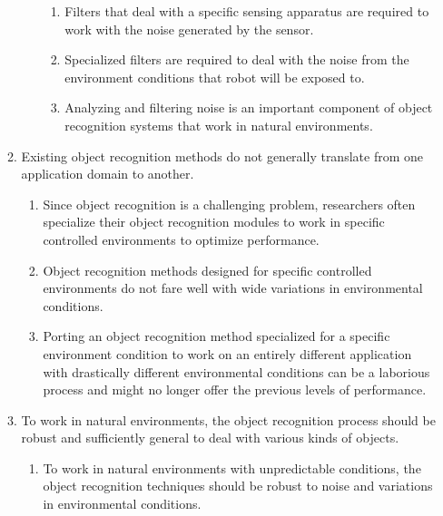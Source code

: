 \documentclass {udthesis}
\begin{document}
\begin{enumerate}[label=Chapter \arabic*:]
\begin{enumerate}[label=Section \arabic*:, start=0]
\begin{enumerate}[label=Subsection \arabic*:, start=1]
      \begin{enumerate}[label=Para \arabic*:, start=1]
        
        \item Filters that deal with a specific sensing apparatus are required to work with the noise generated by the sensor.
        
	\item Specialized filters are required to deal with the noise from the environment conditions that robot will be exposed to.
	
	\item Analyzing and filtering noise is an important component of object recognition systems that work in natural environments.
    
      \end{enumerate}
      
    \end{enumerate}

  \item Existing object recognition methods do not generally translate from one application domain to another.
    
    \begin{enumerate}[label=Para \arabic*:, start=1]
      
      \item Since object recognition is a challenging problem, researchers often specialize their object recognition modules to work in specific controlled environments to optimize performance.
      
      \item Object recognition methods designed for specific controlled environments do not fare well with wide variations in environmental conditions.
      
      \item Porting an object recognition method specialized for a specific environment condition to work on an entirely different application with drastically different environmental conditions can be a laborious process and might no longer offer the previous levels of performance.
          
    \end{enumerate}

  \item To work in natural environments, the object recognition process should be robust and sufficiently general to deal with various kinds of objects.
  
    \begin{enumerate}[label=Para \arabic*:, start=1]
      \item To work in natural environments with unpredictable conditions, the object recognition techniques should be robust to noise and variations in environmental conditions.
      

\end{enumerate}
\end{enumerate}
\end{enumerate}
\end{document}
